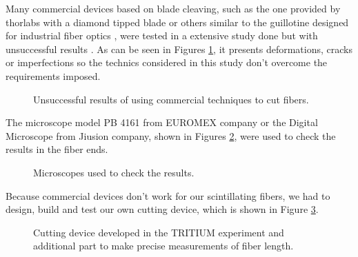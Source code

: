 Many commercial devices based on blade cleaving, such as the one provided by thorlabs with a diamond tipped blade \cite{DiamondThorlabs} or others similar to the guillotine designed for industrial fiber optics \cite{GuillotineIFO}, were tested in a extensive study done but with unsuccessful results \cite{TFGAlberto}. As can be seen in Figures \ref{fig:BadCutsOfFibers}, it presents deformations, cracks or imperfections so the technics considered in this study don't overcome the requirements imposed.

\begin{figure}[htbp]
 \centering
 \caption{Unsuccessful results of using commercial techniques to cut fibers.}
 \label{fig:BadCutsOfFibers}
\end{figure}

The microscope model PB 4161 from EUROMEX company or the Digital Microscope from Jiusion company, shown in Figures \ref{fig:Microscopes}, were used to check the results in the fiber ends.

\begin{figure}[htbp]
 \centering
 \caption{Microscopes used to check the results.}
 \label{fig:Microscopes}
\end{figure}

Because commercial devices don't work for our scintillating fibers, we had to design, build and test our own cutting device, which is shown in Figure \ref{fig:CuttingTRITIUMDevice}.

\begin{figure}[htbp]
 \centering
    \newline
 \caption{Cutting device developed in the TRITIUM experiment and additional part to make precise measurements of fiber length.}
 \label{fig:CuttingTRITIUMDevice}
\end{figure}

